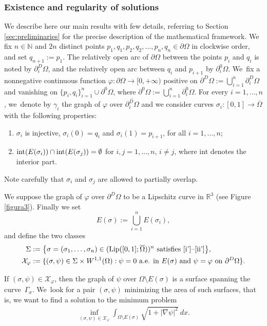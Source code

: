 \documentclass[JEP,XML,SOM,Unicode, NoFloatCountersInSection,published]{cedram}
\newcommand{\R}{\mathbb{R}}
\let\curves\Sigma
\let\Om\Omega
\newcommand{\Lip}{\mathrm{Lip}}
\theoremstyle{definition}
\begin{document}
\subsubsection*{Existence and regularity of solutions}
We describe here our main results with few details, referring to Section \ref{sec:preliminaries}
for the precise description of the mathematical framework.
We
fix $n\in\mathbb N$ and $2n$ distinct points
$p_1,q_1,p_2,q_2,\dots,p_n,q_n \in \partial
\Om$
in clockwise order,
and set $q_{n+1}:=p_1$. The relatively
open arc
of $\partial \Omega$ between the points $p_i$ and $q_i$ is noted by $\partial_i^D\Om$,
and the relatively open
arc between $q_i$ and $p_{i+1}$ by $\partial_i^0\Om$. We~fix a nonnegative
continuous function $\varphi\colon\partial\Om\to[0,+\infty)$
positive on $\partial^D\Om:=\bigcup_{i=1}^n\partial^D_i\Om$ and vanishing
on $\{p_i,q_i\}_{i=1}^n\cup\partial^0\Om$, where $\partial^0\Om:=\bigcup_{i=1}^n\partial^0_i\Om$. For every $i=1,\dots,n$, we~denote by $\gamma_i$ the graph of $\varphi$ over $\overline {\partial^D_i\Om}$
and we consider curves $\sigma_i\colon[0,1]\to\overline \Om$
with the following properties:
\begin{enumerate}[label=(\roman*),wide]
\item{\label{i'}} $\sigma_i$ is injective, $\sigma_i(0)=q_i$ and $\sigma_i(1)=p_{i+1}$, for all $i=1,\dots,n$;
\item{\label{ii'}}
$\textup{int}(E(\sigma_i))\cap \textup{int}(E(\sigma_j))= \emptyset$
for $i,j=1,\dots,n$, $i \neq j$, where int denotes the interior part.
\end{enumerate}
Note carefully that $\sigma_i$ and $\sigma_j$ are allowed
to partially overlap.

We suppose the graph of $\varphi$ over $\partial^D\Om$ to be a Lipschitz curve in $\R^3$ (see Figure \ref{figura3}). Finally we
set
\begin{equation}\label{def:E}
E(\sigma):=\bigcup_{i=1}^n E(\sigma_i),
\end{equation}
and define the two classes
\begin{align}
\curves&:=\big\{\sigma = (\sigma_1,\dots,\sigma_n)
\in (\Lip([0,1]; \overline\Om))^n \text{ satisfies \ref{i'}--\ref{ii'}}\big\},\label{Sigma}
\\
\mathcal X_\varphi&:=\{(\sigma,\psi)\in \Sigma\times W^{1,1}(\Omega):\psi=0\text{ a.e. in }E(\sigma)\text{ and }\psi=\varphi\text{ on }\partial^D\Omega\}.
\label{chi}
\end{align}

If $(\sigma,\psi)\in \mathcal X_\varphi$, then the graph of $\psi$ over $\Om\setminus E(\sigma)$ is a surface spanning the curve~$\Gamma_\sigma$. We~look for a pair
$(\sigma,\psi)$ minimizing the area of such surfaces, that is, we
want to find a solution to the minimum problem
\begin{align}\label{problem1}
\inf_{(\sigma,\psi)\in \mathcal X_\varphi}
\int_{\Omega\setminus E(\sigma)}\sqrt{1+|\nabla \psi|^2}~dx.
\end{align}
\end{document}
